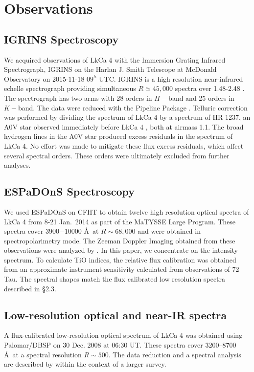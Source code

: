 \documentclass[twocolumn]{emulateapj}%
\newcommand{\name}{LkCa 4 }
\begin{document}
\section{Observations}\label{sec:obs} 

\subsection{IGRINS Spectroscopy}\label{sec:igrins} 
We acquired observations of LkCa 4 with the Immersion Grating Infrared Spectrograph, IGRINS \citep{park14} on the Harlan J. Smith Telescope at McDonald Observatory on 2015-11-18 $09^h$ UTC.  IGRINS is a high resolution near-infrared echelle spectrograph providing simultaneous $R\simeq45,000$ spectra over 1.48-2.48 \um.  The spectrograph has two arms with 28 orders in $H-$band and 25 orders in $K-$band.  The data were reduced with the Pipeline Package \citep{jaejoonlee15}.  Telluric correction was performed by dividing the spectrum of \name by a spectrum of HR 1237, an A0V star observed immediately before \name, both at airmass 1.1.  The broad hydrogen lines in the A0V star produced excess residuals in the spectrum of LkCa 4.  No effort was made to mitigate these flux excess residuals, which affect several spectral orders.  These orders were ultimately excluded from further analyses.


\subsection{ESPaDOnS Spectroscopy}
We used ESPaDOnS on CFHT to obtain twelve high resolution optical spectra of \name from 8-21 Jan.~2014 as part of the MaTYSSE Large Program.  These spectra cover 3900$-$10000 \AA\ at $R\sim68,000$ and were obtained in spectropolarimetry mode.  The Zeeman Doppler Imaging obtained from these observations were analyzed by \citet{donati14}.  In this paper, we concentrate on the intensity spectrum.  To calculate TiO indices, the relative flux calibration was obtained from an approximate instrument sensitivity calculated from observations of 72 Tau.  The spectral shapes match the flux calibrated low resolution spectra described in \S 2.3.


\subsection{Low-resolution optical and near-IR spectra}

A flux-calibrated low-resolution optical spectrum of LkCa 4 was obtained using Palomar/DBSP \citep[DBSP,][]{oke82} on 30 Dec. 2008 at 06:30 UT.  These spectra cover 3200--8700 \AA\ at a spectral resolution $R\sim 500$.  The data reduction and a spectral analysis are described by \citet{herczeg14} within the context of a larger survey.
\end{document}
